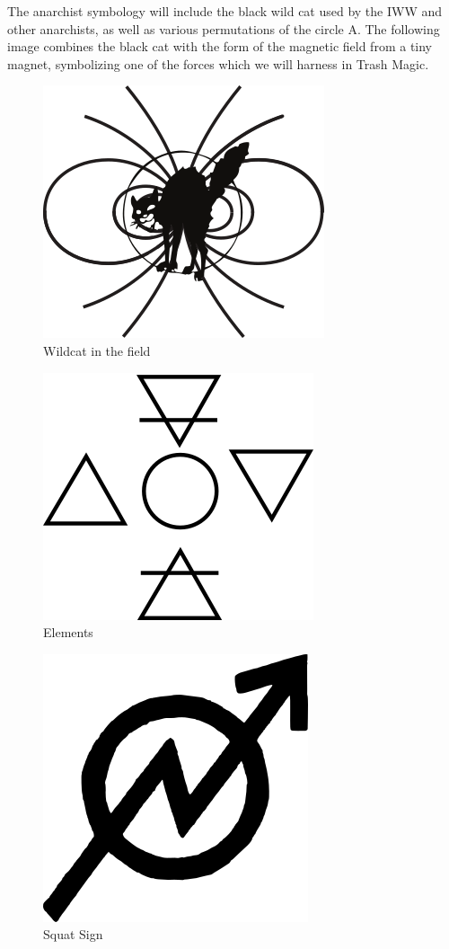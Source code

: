 The anarchist symbology will include the black wild cat used by the IWW
and other anarchists, as well as various permutations of the circle A.
The following image combines the black cat with the form of the magnetic
field from a tiny magnet, symbolizing one of the forces which we will
harness in Trash Magic.

\begin{figure}[htbp]
\centering
\includegraphics{images/cat3.png}
\caption{Wildcat in the field}
\end{figure}

\begin{figure}[htbp]
\centering
\includegraphics{images/elements.png}
\caption{Elements}
\end{figure}

\begin{figure}[htbp]
\centering
\includegraphics{images/squat.png}
\caption{Squat Sign}
\end{figure}

